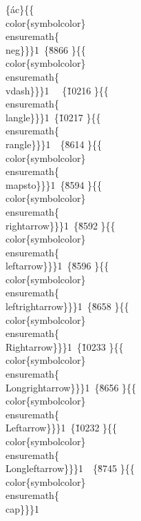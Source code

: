 {\{\'ac\}\{\{\\color\{symbolcolor\}\\ensuremath\{\\neg\}\}\}1\
\{\u8866 \}\{\{\\color\{symbolcolor\}\\ensuremath\{\\vdash\}\}\}1\
\
\{\u10216 \}\{\{\\ensuremath\{\\langle\}\}\}1\
\{\u10217 \}\{\{\\ensuremath\{\\rangle\}\}\}1\
\
\{\u8614 \}\{\{\\color\{symbolcolor\}\\ensuremath\{\\mapsto\}\}\}1\
\{\u8594 \}\{\{\\color\{symbolcolor\}\\ensuremath\{\\rightarrow\}\}\}1\
\{\u8592 \}\{\{\\color\{symbolcolor\}\\ensuremath\{\\leftarrow\}\}\}1\
\{\u8596 \}\{\{\\color\{symbolcolor\}\\ensuremath\{\\leftrightarrow\}\}\}1\
\{\u8658 \}\{\{\\color\{symbolcolor\}\\ensuremath\{\\Rightarrow\}\}\}1\
\{\u10233 \}\{\{\\color\{symbolcolor\}\\ensuremath\{\\Longrightarrow\}\}\}1\
\{\u8656 \}\{\{\\color\{symbolcolor\}\\ensuremath\{\\Leftarrow\}\}\}1\
\{\uc0\u10232 \}\{\{\\color\{symbolcolor\}\\ensuremath\{\\Longleftarrow\}\}\}1\
\
\{\uc0\u8745 \}\{\{\\color\{symbolcolor\}\\ensuremath\{\\cap\}\}\}1\
}

